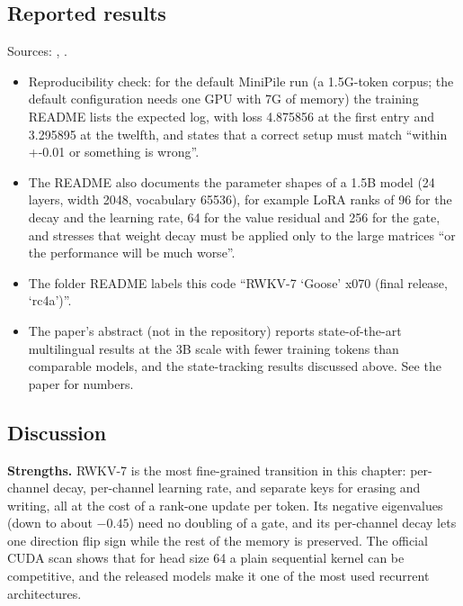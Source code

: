 \subsection{Reported results}

\begin{results}
Sources: ,
.
\begin{itemize}
\item Reproducibility check: for the default MiniPile run (a 1.5G-token corpus; the default
configuration needs one GPU with 7G of memory) the training README lists the expected log,
with loss 4.875856 at the first entry and 3.295895 at the twelfth, and states that a correct
setup must match ``within +-0.01 or something is wrong''.
\item The README also documents the parameter shapes of a 1.5B model (24 layers, width 2048,
vocabulary 65536), for example LoRA ranks of 96 for the decay and the learning rate, 64 for
the value residual and 256 for the gate, and stresses that weight decay must be applied only
to the large matrices ``or the performance will be much worse''.
\item The folder README labels this code ``RWKV-7 `Goose' x070 (final release, `rc4a')''.
\item The paper's abstract (not in the repository) reports state-of-the-art multilingual
results at the 3B scale with fewer training tokens than comparable models, and the
state-tracking results discussed above. See the paper for numbers.
\end{itemize}
\end{results}

\subsection{Discussion}

\textbf{Strengths.} RWKV-7 is the most fine-grained transition in this chapter:
per-channel decay, per-channel learning rate, and separate keys for erasing and writing,
all at the cost of a rank-one update per token. Its negative eigenvalues (down to about
$-0.45$) need no doubling of a gate, and its per-channel decay lets one direction flip sign
while the rest of the memory is preserved. The official CUDA scan shows that for head size
64 a plain sequential kernel can be competitive, and the released models make it one of
the most used recurrent architectures.

